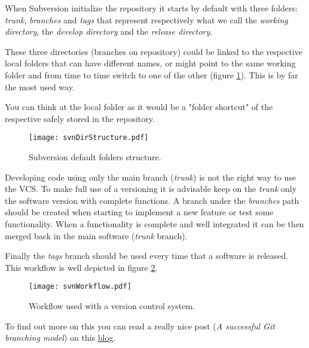 When Subversion initialize the repository it starts by default with three folders: \textit{trunk}, \textit{branches} and \textit{tags} that represent respectively what we call the \textit{working directory}, the \textit{develop directory} and the \textit{release directory}.

These three directories (branches on repository) could be linked to the respective local folders that can have different names, or might point to the same working folder and from time to time switch to one of the other (figure \ref{fig:svnDirStructure}). This is by far the most used way.

You can think at the local folder as it would be a "folder shortcut" of the respective safely stored in the repository.

\begin{figure}[htbp]
    \centering
    \texttt{[image: svnDirStructure.pdf]}
    \caption{Subversion default folders structure.}
    \label{fig:svnDirStructure}
\end{figure}

Developing code using only the main branch (\textit{trunk}) is not the right way to use the VCS. To make full use of a versioning it is advisable keep on the \textit{trunk} only the software version with complete functions. A branch under the \textit{branches} path should be created when starting to implement a new feature or test some functionality. When a functionality is complete and well integrated it can be then merged back in the main software (\textit{trunk} branch).

Finally the \textit{tags} branch should be used every time that a software is released. This workflow is well depicted in figure \ref{fig:svnWorkflow}.

\begin{figure}[htbp]
    \centering
    \texttt{[image: svnWorkflow.pdf]}
    \caption{Workflow used with a version control system.}
    \label{fig:svnWorkflow}
\end{figure}

To find out more on this you can read a really nice post (\textit{A successful Git branching model}) on this \href{http://nvie.com/posts/a-successful-git-branching-model/}{blog}.









